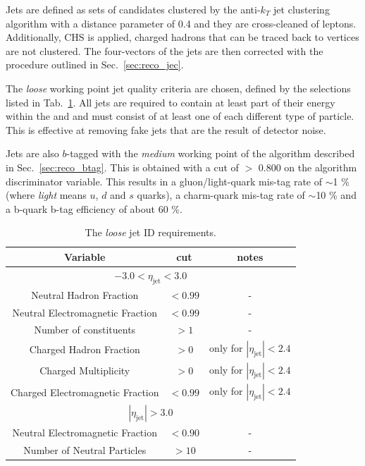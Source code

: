 Jets are defined as sets of \PF candidates clustered by the
anti-$k_{T}$ jet clustering algorithm with a distance parameter of 0.4
and they are cross-cleaned of leptons. Additionally, \ac{CHS} is
applied, charged hadrons that can be traced back to \PU vertices are
not clustered. The four-vectors of the jets are then corrected with
the procedure outlined in Sec.~\ref{sec:reco_jec}.

The \emph{loose} working point jet quality criteria are chosen, defined
by the selections listed in Tab.~\ref{tab:loose-jet-id}. All jets are
required to contain at least part of their energy within the \ECAL and
\HCAL and must consist of at least one of each different type of
particle. This is effective at removing fake jets that are the result
of detector noise.  

Jets are also $b$-tagged with the \emph{medium} working point of the
algorithm described in Sec.~\ref{sec:reco_btag}. This is obtained with
a cut of $>$ 0.800 on the algorithm discriminator variable. This
results in a gluon/light-quark mis-tag rate of $\sim$1 \% (where
\emph{light} means $u$, $d$ and $s$ quarks), a charm-quark mis-tag
rate of $\sim$10 \% and a b-quark b-tag efficiency of about 60 \%. 

\begin{table}[ht!]
  \caption{The \emph{loose} jet ID requirements. \label{tab:loose-jet-id}}
  \centering
  \begin{tabular}{ ccc }
    Variable & cut & notes \\ \hline
    \multicolumn{3}{c}{$-3.0 < \eta_{\mathrm{jet}} < 3.0$} \\ \hline    
    Neutral Hadron Fraction & $<0.99$ & - \\
    Neutral Electromagnetic Fraction & $<0.99$ & - \\
    Number of constituents & $>1$ & - \\
    Charged Hadron Fraction & $>0$ & only for $|\eta_{\mathrm{jet}}| < 2.4$ \\
    Charged Multiplicity & $>0$ & only for $|\eta_{\mathrm{jet}}| < 2.4$ \\
    Charged Electromagnetic Fraction & $<0.99$ & only for $|\eta_{\mathrm{jet}}| < 2.4$ \\ \hline
    \multicolumn{3}{c}{$|\eta_{\mathrm{jet}}| > 3.0$} \\ \hline        
    Neutral Electromagnetic Fraction & $<0.90$ & - \\
    Number of Neutral Particles & $>10$ & - \\
  \end{tabular}
\end{table}

